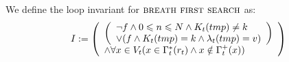 \documentclass[headings=small,a4paper,12pt]{scrartcl}
\newcommand{\bfs}{\textsc{breath first search}\xspace}
\begin{document}
\text We define the loop invariant for $\bfs$ as:\\
\begin{align*}
    {I:=\left(
      \begin{array}{l}
      \left(
    \begin{array}{l}
    \neg f \wedge0 \leqslant n \leqslant N \wedge K_t(tmp) \neq k\\
    \vee(f\wedge K_t(tmp) = k \wedge\lambda_t(tmp) = v)
        \end{array}
      \right)\\
       \wedge\forall x\in V_t(x\in \Gamma^{*}_{t}(r_t)\wedge x \notin\Gamma^{+}_{t}(x))
  \end{array}
    \right)}\\
\end{align*}
\break
\end{document}
